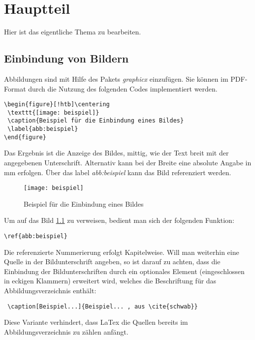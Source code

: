 \chapter{Hauptteil}
\label{kap:hauptteil}

Hier ist das eigentliche Thema zu bearbeiten.

\section{Einbindung von Bildern}
\label{kap:einbindungbilder}
Abbildungen sind mit Hilfe des Pakets \textit{graphicx} einzufügen. Sie können im PDF-Format durch die Nutzung des folgenden Codes implementiert werden.
\begin{verbatim}
\begin{figure}[!htb]\centering
 \texttt{[image: beispiel]}
 \caption{Beispiel für die Einbindung eines Bildes}
 \label{abb:beispiel}
\end{figure}
\end{verbatim}
Das Ergebnis ist die Anzeige des Bildes, mittig, wie der Text breit mit der angegebenen Unterschrift. Alternativ kann bei der Breite eine absolute Angabe in mm erfolgen. Über das label \textit{abb:beispiel} kann das Bild referenziert werden.
\begin{figure}[!htb]\centering
 \texttt{[image: beispiel]}
 \caption{Beispiel für die Einbindung eines Bildes}
 \label{abb:beispiel}
\end{figure}
Um auf das Bild \ref{abb:beispiel} zu verweisen, bedient man sich der folgenden Funktion:
\begin{verbatim}
\ref{abb:beispiel}
\end{verbatim}
Die referenzierte Nummerierung erfolgt Kapitelweise. Will man weiterhin eine Quelle in der Bildunterschrift angeben, so ist darauf zu achten, dass die Einbindung der Bildunterschriften durch ein optionales Element (eingeschlossen in eckigen Klammern) erweitert wird, welches die Beschriftung für das Abbildungsverzeichnis enthält:
\begin{verbatim}
 \caption[Beispiel...]{Beispiel... , aus \cite{schwab}}
\end{verbatim}
Diese Variante verhindert, dass LaTex die Quellen bereits im Abbildungsverzeichnis zu zählen anfängt.

